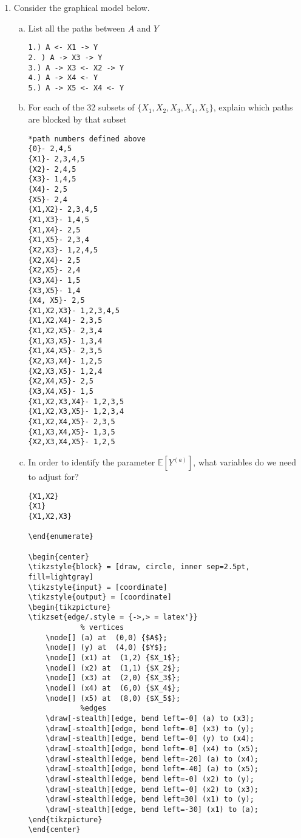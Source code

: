 \documentclass[10pt]{article}
\newcommand{\E}{\mathbb{E}}
\begin{document}
\begin{enumerate}
\item Consider the graphical model below.
\begin{enumerate}[(a)]
\item List all the paths between $A$ and $Y$

\begin{verbatim}
1.) A <- X1 -> Y
2. ) A -> X3 -> Y
3.) A -> X3 <- X2 -> Y
4.) A -> X4 <- Y
5.) A -> X5 <- X4 <- Y
\end{verbatim}

\item For each of the 32 subsets of $\{X_1,X_2,X_3,X_4,X_5\}$, explain which paths are blocked by that subset

\begin{verbatim}
*path numbers defined above
{0}- 2,4,5
{X1}- 2,3,4,5
{X2}- 2,4,5
{X3}- 1,4,5
{X4}- 2,5
{X5}- 2,4
{X1,X2}- 2,3,4,5
{X1,X3}- 1,4,5
{X1,X4}- 2,5
{X1,X5}- 2,3,4
{X2,X3}- 1,2,4,5
{X2,X4}- 2,5
{X2,X5}- 2,4
{X3,X4}- 1,5
{X3,X5}- 1,4
{X4, X5}- 2,5
{X1,X2,X3}- 1,2,3,4,5
{X1,X2,X4}- 2,3,5
{X1,X2,X5}- 2,3,4
{X1,X3,X5}- 1,3,4
{X1,X4,X5}- 2,3,5
{X2,X3,X4}- 1,2,5
{X2,X3,X5}- 1,2,4
{X2,X4,X5}- 2,5
{X3,X4,X5}- 1,5
{X1,X2,X3,X4}- 1,2,3,5
{X1,X2,X3,X5}- 1,2,3,4
{X1,X2,X4,X5}- 2,3,5
{X1,X3,X4,X5}- 1,3,5
{X2,X3,X4,X5}- 1,2,5
\end{verbatim}


\item In order to identify the parameter $\E[Y^{(a)}]$, what variables do we need to adjust for?
\begin{verbatim}
{X1,X2}
{X1}
{X1,X2,X3}

\end{enumerate}

\begin{center}
\tikzstyle{block} = [draw, circle, inner sep=2.5pt, fill=lightgray]
\tikzstyle{input} = [coordinate]
\tikzstyle{output} = [coordinate]
\begin{tikzpicture}
\tikzset{edge/.style = {->,> = latex'}}
            % vertices
	\node[] (a) at  (0,0) {$A$};
	\node[] (y) at  (4,0) {$Y$};
	\node[] (x1) at  (1,2) {$X_1$};
	\node[] (x2) at  (1,1) {$X_2$};
	\node[] (x3) at  (2,0) {$X_3$};
	\node[] (x4) at  (6,0) {$X_4$};
	\node[] (x5) at  (8,0) {$X_5$};
            %edges
	\draw[-stealth][edge, bend left=-0] (a) to (x3);                                                       
	\draw[-stealth][edge, bend left=-0] (x3) to (y);			
	\draw[-stealth][edge, bend left=-0] (y) to (x4);
	\draw[-stealth][edge, bend left=-0] (x4) to (x5);
	\draw[-stealth][edge, bend left=-20] (a) to (x4);
	\draw[-stealth][edge, bend left=-40] (a) to (x5);
	\draw[-stealth][edge, bend left=-0] (x2) to (y);
	\draw[-stealth][edge, bend left=-0] (x2) to (x3);
	\draw[-stealth][edge, bend left=30] (x1) to (y);
	\draw[-stealth][edge, bend left=-30] (x1) to (a);
\end{tikzpicture}
\end{center} 


\end{verbatim}
\end{enumerate}
\end{enumerate}
\end{document}
